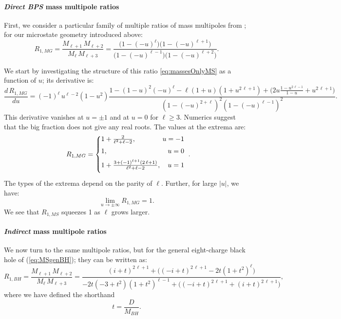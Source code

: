 \documentclass[12pt,a4paper]{article}
\newcommand{\be}{\begin{equation}}
\newcommand{\ee}{\end{equation}}
\def\Indirect{\emph{Indirect} }
\def\Direct{\emph{Direct BPS} }
\begin{document}
\paragraph{\Direct mass multipole ratios}
First, we consider a particular family of multiple ratios of mass multipoles from \cite{Bena:2020uup}; for our microstate geometry introduced above:
\begin{equation}
R_{1,MG}=\frac{M_{\ell+1}\,M_{\ell+2}}{M_\ell\,M_{\ell+3}}=\frac{\big(1-(-u)^\ell\big)\big(1-(-u)^{\ell+1}\big)}{\big(1-(-u)^{\ell-1}\big)\big(1-(-u)^{\ell+2}\big)}.\label{eq:massesOnlyMS}
\end{equation}

We start by investigating the structure of this ratio \eqref{eq:massesOnlyMS} as a function of $u$; its derivative is:
\begin{equation}
\frac{d\,R_{1,MG}}{du}=(-1)^\ell\,u^{\ell-2}(1-u^2)\frac{1-(1-u)^2(-u)^\ell-\ell(1+u)(1+u^{2\,\ell+1})+\Big(2u\frac{1-u^{2\,\ell-1}}{1-u}+u^{2\,\ell+1}\Big)}{(1-(-u)^{2+\ell})^2(1-(-u)^{\ell-1})^2}.
\end{equation}
This derivative vanishes at $u=\pm1$ and at $u=0$ for $\ell\geq 3$. Numerics suggest that the big fraction does not give any real roots. The values at the extrema are:
\begin{align}
\begin{array}{rcl}
R_{1,MG}=
\left\{\begin{array}{@{}l@{}}
1+\frac{2}{\ell^2+\ell-2},\quad\hfill u=-1\vspace{1mm}\\[\jot]
1,\quad\hfill u=0\vspace{1mm}\\[\jot]
1+\frac{3+(-1)^{\ell+1}(2\,\ell+1)}{\ell^2+\ell-2},\quad u=1\vspace{1mm}
\vspace{1mm}\end{array}\right.
\\
\end{array}\label{eq:massesOnlyMSAtExtrema}
\vspace*{7.5mm}.
\end{align}
The types of the extrema depend on the parity of $\ell$. Further, for large $|u|$, we have:
\begin{equation}
\lim\limits_{u\rightarrow\pm\infty}R_{1,MG}=1.
\end{equation}
We see that $R_{1,MS}$ squeezes 1 as $\ell$ grows larger.

\paragraph{\Indirect mass multipole ratios}
We now turn to the same multipole ratios, but for the general eight-charge black hole of (\ref{eq:MSgenBH}); they can be written as:
\be \label{eq:massesOnlyBH}
R_{1,BH}=\frac{M_{\ell+1}\,M_{\ell+2}}{M_\ell\,M_{\ell+3}}=\frac{(i+t)^{2\,\ell+1}+\big((-i+t)^{2\,\ell+1}-2t(1+t^2)^\ell\big)}{-2t(-3+t^2)(1+t^2)^{\ell-1}+\big((-i+t)^{2\,\ell+1}+(i+t)^{2\,\ell+1}\big)},\ee
where we have defined the shorthand
\be t=\frac{D}{M_{BH}}. \ee
\end{document}
